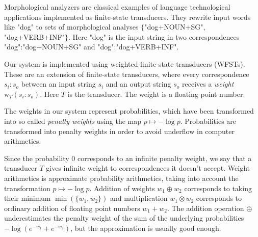 \documentclass[a4paper,conference]{IEEEtran}
\begin{document}
Morphological analyzers are classical examples of language
technological applications implemented as finite-state
transducers. They rewrite input words like "dog" to sets of
morphological analyses $\{$"dog+NOUN+SG", "dog+VERB+INF"$\}$. Here
"dog" is the input string in two correspondences "dog":"dog+NOUN+SG"
and "dog":"dog+VERB+INF".

Our system is implemented using weighted finite-state transducers
(WFSTs). These are an extension of finite-state transducers, where
every correspondence $s_i\mathrm{:}s_o$ between an input string $s_i$
and an output string $s_o$ receives a {\it weight} $\mathrm{w}_T(s_i\mathrm{:}s_o)$. Here $T$ is the transducer. The weight is a floating point number. 

The weights in our system represent probabilities, which have been
transformed into so called {\it penalty weights} using the map $p
\mapsto -\log p$. Probabilities are transformed into penalty weights
in order to avoid underflow in computer arithmetics. 

Since the probability $0$ corresponds to an infinite penalty weight,
we say that a transducer $T$ gives infinite weight to correspondences
it doesn't accept. Weight arithmetics is approximate probability
arithmetics, taking into account the transformation $p \mapsto -\log
p$. Addition of weights $w_1 \oplus w_2$ corresponds to taking their
minimum $\min(\{w_1,w_2\})$ and multiplication $w_1 \otimes w_2$
corresponds to ordinary addition of floating point numbers $w_1 +
w_2$. The addition operation $\oplus$ underestimates the penalty
weight of the sum of the underlying probabilities $-\log (e^{-w_1} +
e^{-w_2})$, but the approximation is usually good enough.
\end{document}
